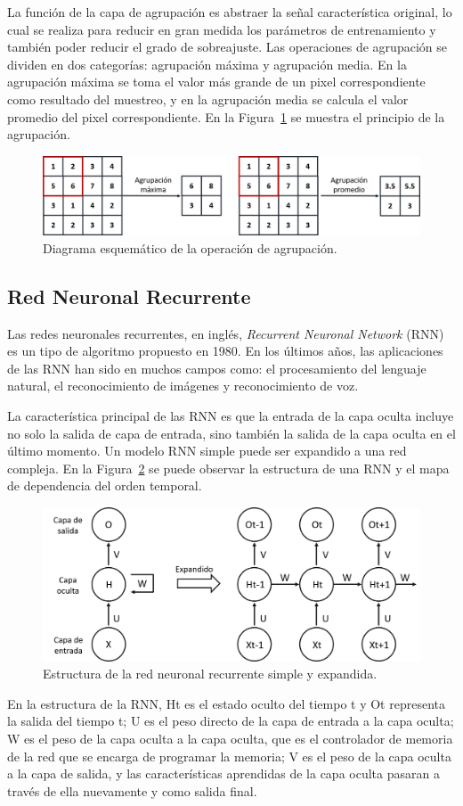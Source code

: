  La función de la capa de agrupación es abstraer la señal característica original, lo cual se realiza para reducir en gran medida los parámetros de entrenamiento y también poder reducir el grado de sobreajuste. Las operaciones de agrupación se dividen en dos categorías: agrupación máxima y agrupación media. En la agrupación máxima se toma el valor más grande de un pixel correspondiente como resultado del muestreo, y en la agrupación media se calcula el valor promedio del pixel correspondiente. En la Figura~\ref{fig:Agrupacion} se muestra el principio de la agrupación.

  \begin{figure}[!h]
     \centering
     \includegraphics[width=.7\textwidth]{Imagenes/Agrupamiento.png}
     \caption{Diagrama esquemático de la operación de agrupación.}
     \label{fig:Agrupacion}
 \end{figure}

 \subsection{Red Neuronal Recurrente}

 Las redes neuronales recurrentes, en inglés, \textit{Recurrent Neuronal Network} (RNN) es un tipo de algoritmo propuesto en 1980. En los últimos años, las aplicaciones de las RNN han sido en muchos campos como: el procesamiento del lenguaje natural, el reconocimiento de imágenes y reconocimiento de voz.

 La característica principal de las RNN es que la entrada de la capa oculta incluye no solo la salida de capa de entrada, sino también la salida de la capa oculta en el último momento. Un modelo RNN simple puede ser expandido a una red compleja. En la Figura~\ref{fig:RNN} se puede observar la estructura de una RNN y el mapa de dependencia del orden temporal.

   \begin{figure}[!h]
     \centering
     \includegraphics[width=.7\textwidth]{Imagenes/RNN.png}
     \caption{Estructura de la red neuronal recurrente simple y expandida.}
     \label{fig:RNN}
 \end{figure}

En la estructura de la RNN, Ht es el estado oculto del tiempo t y Ot representa la salida del tiempo t; U es el peso directo de la capa de entrada a la capa oculta; W es el peso de la capa oculta a la capa oculta, que es el controlador de memoria de la red que se encarga de programar la memoria; V es el peso de la capa oculta a la capa de salida, y las características aprendidas de la capa oculta pasaran a través de ella nuevamente y como salida final.